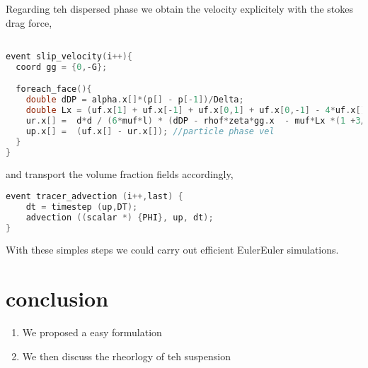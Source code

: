 Regarding teh dispersed phase we obtain the velocity explicitely with the stokes drag force, 
\begin{lstlisting}[language=C]

event slip_velocity(i++){
  coord gg = {0,-G};

  foreach_face(){
    double dDP = alpha.x[]*(p[] - p[-1])/Delta; 
    double Lx = (uf.x[1] + uf.x[-1] + uf.x[0,1] + uf.x[0,-1] - 4*uf.x[])/(Delta*Delta);
    ur.x[] =  d*d / (6*muf*l) * (dDP - rhof*zeta*gg.x  - muf*Lx *(1 +3/4*lambda/(lambda+1)) );
    up.x[] =  (uf.x[] - ur.x[]); //particle phase vel
  }  
}
\end{lstlisting}

and transport the volume fraction fields accordingly, 

\begin{lstlisting}[language=C]
event tracer_advection (i++,last) {
    dt = timestep (up,DT);
    advection ((scalar *) {PHI}, up, dt);
}
\end{lstlisting}
    

With these simples steps we could carry out efficient EulerEuler simulations. 


\section{conclusion}


\begin{enumerate}
    \item We proposed a easy formulation 
    \item We then discuss the rheorlogy of teh suspension 
\end{enumerate}